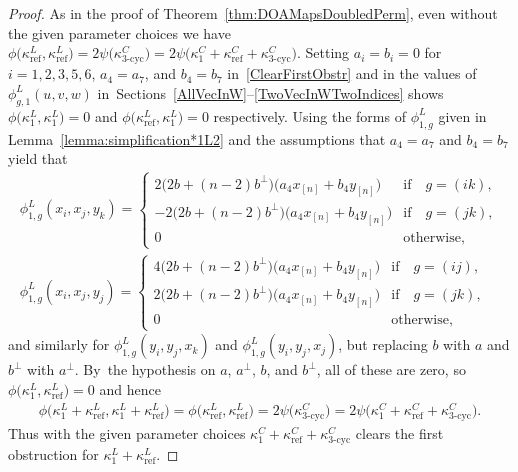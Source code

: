 \documentclass[pdftex]{sigma}
\numberwithin{equation}{section}
\DeclareMathOperator{\refl}{ref}
\DeclareMathOperator{\tri}{3-cyc}
\begin{document}
\begin{proof}
As in the proof of Theorem~\ref{thm:DOAMapsDoubledPerm},
even without the given parameter choices we have
$\phi\big(\kappa^L_{\refl},\kappa^L_{\refl}\big)=2\psi\big(\kappa^C_{\tri}\big)=
2\psi\big(\kappa^C_1+\kappa^C_{\refl}+\kappa^C_{\tri}\big)$.
Setting $a_i=b_i=0$ for $i=1, 2, 3, 5, 6$, $a_4=a_7$, and $b_4=b_7$
in~\eqref{ClearFirstObstr} and in the values of $\phi^L_{g,1}(u,v,w)$
in~Sections~\ref{AllVecInW}--\ref{TwoVecInWTwoIndices} shows
$\phi\big(\kappa^L_1,\kappa^L_1\big)=0$ and $\phi\big(\kappa^L_{\refl},\kappa^L_1\big)=0$ respectively.
Using the forms of $\phi^L_{1,g}$ given in Lemma~\ref{lemma:simplification*1L2} and the assumptions that $a_4=a_7$ and $b_4=b_7$ yield that
\begin{gather*}
\phi^L_{1,g}(x_i,x_j,y_k)=
\begin{cases}
2\big(2b + (n-2)b^\perp\big)\big(a_4x_{[n]}+b_4y_{[n]}\big) & \text{if}\quad g=(ik), \\
-2\big(2b + (n-2)b^\perp\big)\big(a_4x_{[n]}+b_4y_{[n]}\big) & \text{if}\quad g=(jk), \\
0 & \text{otherwise},
\end{cases}
\\
\phi^L_{1,g}(x_i,x_j,y_j)=
\begin{cases}
4\big(2b + (n-2)b^\perp\big)\big(a_4x_{[n]}+b_4y_{[n]}\big) & \text{if}\quad g=(ij), \\
2\big(2b + (n-2)b^\perp\big)\big(a_4x_{[n]}+b_4y_{[n]}\big) & \text{if}\quad g=(jk), \\
 0 & \text{otherwise},
\end{cases}
\end{gather*}
and
similarly for $\phi^L_{1,g}(y_i,y_j,x_k)$ and $\phi^L_{1,g}(y_i,y_j,x_j)$,
but replacing $b$ with $a$ and $b^\perp$ with $a^\perp$. By~the hypothesis on $a$, $a^\perp$, $b$, and $b^\perp$, all of these are zero,
so $\phi\big(\kappa^L_1,\kappa^L_{\refl}\big)=0$
and hence
\begin{gather*}
\phi\big(\kappa^L_1+\kappa^L_{\refl},\kappa^L_1+\kappa^L_{\refl}\big)=
\phi\big(\kappa^L_{\refl},\kappa^L_{\refl}\big)=
2\psi\big(\kappa^C_{\tri}\big)=
2\psi\big(\kappa^C_1+\kappa^C_{\refl}+\kappa^C_{\tri}\big).
\end{gather*}
Thus with the given parameter choices
$\kappa^C_1+\kappa^C_{\refl}+\kappa^C_{\tri}$
clears the first obstruction for $\kappa^L_1+\kappa^L_{\refl}$.


\end{proof}
\end{document}
